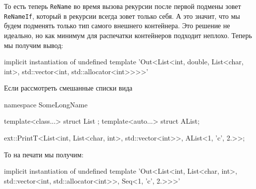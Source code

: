 То есть теперь \verb"ReName" во время вызова рекурсии после первой подмены зовет \verb"ReNameIf", который в рекурсии всегда зовет только себя.
А это значит, что мы будем подменять только тип самого внешнего контейнера.
Это решение не идеально, но как минимум для распечатки контейнеров подходит неплохо.
Теперь мы получим вывод:
\begin{cppcode}
implicit instantiation of undefined template
'Out<List<int, double, List<char, int>, std::vector<int, std::allocator<int>>>>'
\end{cppcode}
Если рассмотреть смешанные списки вида
\begin{cppcode}
namespace SomeLongName {
  template<class...>
  struct List {};
  template<auto...>
  struct AList{};  
  
  ext::PrintT<List<int, List<char, int>, std::vector<int>>, AList<1, 'c', 2.>>;
}
\end{cppcode}
То на печати мы получим:
\begin{cppcode}
implicit instantiation of undefined template
'Out<List<int, List<char, int>, std::vector<int, std::allocator<int>>, Seq<1, 'c', 2.>>>'
\end{cppcode}
